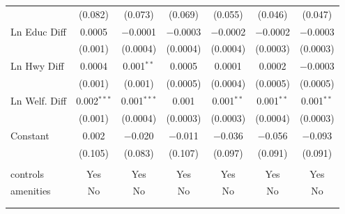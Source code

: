 \begin{table}[!htbp]
\begin{tabular}{@{\extracolsep{5pt}}lcccccc}
  & (0.082) & (0.073) & (0.069) & (0.055) & (0.046) & (0.047) \\ 
  Ln Educ Diff & 0.0005 & $-$0.0001 & $-$0.0003 & $-$0.0002 & $-$0.0002 & $-$0.0003 \\ 
  & (0.001) & (0.0004) & (0.0004) & (0.0004) & (0.0003) & (0.0003) \\ 
  Ln Hwy Diff & 0.0004 & 0.001$^{**}$ & 0.0005 & 0.0001 & 0.0002 & $-$0.0003 \\ 
  & (0.001) & (0.001) & (0.0005) & (0.0004) & (0.0005) & (0.0005) \\ 
  Ln Welf. Diff & 0.002$^{***}$ & 0.001$^{***}$ & 0.001 & 0.001$^{**}$ & 0.001$^{**}$ & 0.001$^{**}$ \\ 
  & (0.001) & (0.0004) & (0.0003) & (0.0003) & (0.0004) & (0.0003) \\ 
  Constant & 0.002 & $-$0.020 & $-$0.011 & $-$0.036 & $-$0.056 & $-$0.093 \\ 
  & (0.105) & (0.083) & (0.107) & (0.097) & (0.091) & (0.091) \\ 
 \hline \\[-1.8ex] 
controls & Yes & Yes & Yes & Yes & Yes & Yes \\ 
amenities & No & No & No & No & No & No \\ 
\hline \\[-1.8ex] 
\hline 
\hline \\[-1.8ex] 
\end{tabular} 
\end{table} 
